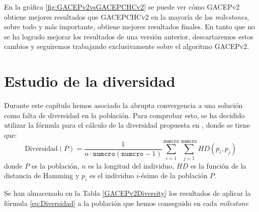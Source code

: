 En la gráfica \ref{fig:GACEPv2vsGACEPCHCv2} se puede ver cómo GACEPv2 obtiene mejores resultados que GACEPCHCv2 en la mayoría de las \textit{milestones}, sobre todo y más importante, obtiene mejores resultados finales. 
En tanto que no se ha logrado mejorar los resultados de una versión anterior, descartaremos estos cambios y seguiremos trabajando exclusivamente sobre el algoritmo GACEPv2.

\section{Estudio de la diversidad}

Durante este capítulo hemos asociado la abrupta convergencia a una solución como falta de diversidad en la población. 
Para comprobar esto, se ha decidido utilizar la fórmula para el cálculo de la diversidad propuesta en \parencite{oppacherShiftingBalanceGenetic}, donde se tiene que:
\begin{equation}
\text{Diversidad}(P) = \dfrac{1}{n\cdot \texttt{numcro}(\texttt{numcro}-1)}\sum_{i=1}^{\texttt{numcro}}\sum_{j=1}^{\texttt{numcro}} HD(p_i,p_j)
\label{eq:Diversidad}
\end{equation}
donde $P$ es la población, $n$ es la longitud del individuo, $HD$ es la función de la distancia de Hamming y $p_i$ es el individuo $i$-ésimo de la población $P$.

Se han almacenado en la Tabla \ref{GACEPv2Diversity} los resultados de aplicar la fórmula \ref{eq:Diversidad} a la población que hemos conseguido en cada \textit{milestone}


